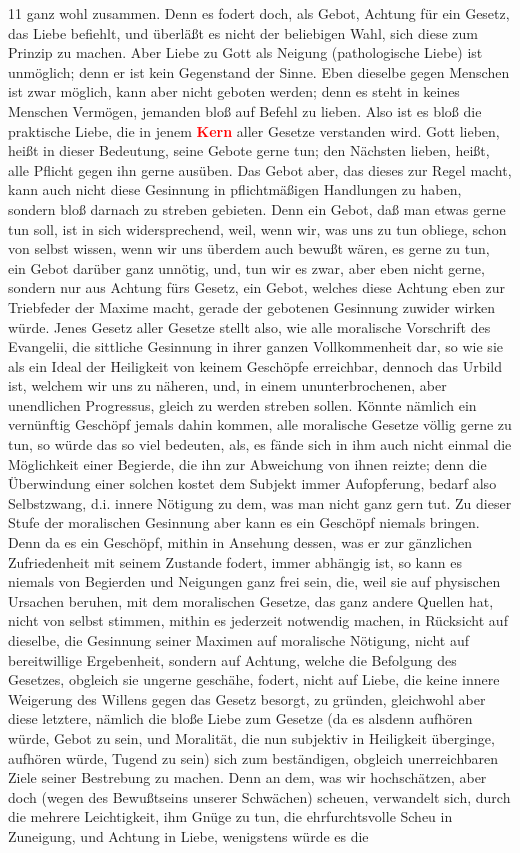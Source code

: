 \documentclass[a4paper,12pt,twoside]{book}
\newcommand{\match}[1]{\textcolor{red}{\textbf{#1}}}
\begin{document}
	
	11
	ganz wohl zusammen. Denn es fodert doch, als Gebot, Achtung für ein Gesetz, das Liebe befiehlt, und überläßt es nicht der beliebigen Wahl, sich diese zum Prinzip zu machen. Aber Liebe zu Gott als Neigung (pathologische Liebe) ist unmöglich; denn er ist kein Gegenstand der Sinne. Eben dieselbe gegen Menschen ist zwar möglich, kann aber nicht geboten werden; denn es steht in keines Menschen Vermögen, jemanden bloß auf Befehl zu lieben. Also ist es bloß die praktische Liebe, die in jenem \match{Kern} aller Gesetze verstanden wird. Gott lieben, heißt in dieser Bedeutung, seine Gebote gerne tun; den Nächsten lieben, heißt, alle Pflicht gegen ihn gerne ausüben. Das Gebot aber, das dieses zur Regel macht, kann auch nicht diese Gesinnung in pflichtmäßigen Handlungen zu haben, sondern bloß darnach zu streben gebieten. Denn ein Gebot, daß man etwas gerne tun soll, ist in sich widersprechend, weil, wenn wir, was uns zu tun obliege, schon von selbst wissen, wenn wir uns überdem auch bewußt wären, es gerne zu tun, ein Gebot darüber ganz unnötig, und, tun wir es zwar, aber eben nicht gerne, sondern nur aus Achtung fürs Gesetz, ein Gebot, welches diese Achtung eben zur Triebfeder der Maxime macht, gerade der gebotenen Gesinnung zuwider wirken würde. Jenes Gesetz aller Gesetze stellt also, wie alle moralische Vorschrift des Evangelii, die sittliche  Gesinnung in ihrer ganzen Vollkommenheit dar, so wie sie als ein Ideal der Heiligkeit von keinem Geschöpfe erreichbar, dennoch das Urbild ist, welchem wir uns zu näheren, und, in einem ununterbrochenen, aber unendlichen Progressus, gleich zu werden streben sollen. Könnte nämlich ein vernünftig Geschöpf jemals dahin kommen, alle moralische Gesetze völlig gerne zu tun, so würde das so viel bedeuten, als, es fände sich in ihm auch nicht einmal die Möglichkeit einer Begierde, die ihn zur Abweichung von ihnen reizte; denn die Überwindung einer solchen kostet dem Subjekt immer Aufopferung, bedarf also Selbstzwang, d.i. innere Nötigung zu dem, was man nicht ganz gern tut. Zu dieser Stufe der moralischen Gesinnung aber kann es ein Geschöpf niemals bringen. Denn da es ein Geschöpf, mithin in Ansehung dessen, was er zur gänzlichen Zufriedenheit mit seinem Zustande fodert, immer abhängig ist, so kann es niemals von Begierden und Neigungen ganz frei sein, die, weil sie auf physischen Ursachen beruhen, mit dem moralischen Gesetze, das ganz andere Quellen hat, nicht von selbst stimmen, mithin es jederzeit notwendig machen, in Rücksicht auf dieselbe, die Gesinnung seiner Maximen auf moralische Nötigung, nicht auf bereitwillige Ergebenheit, sondern auf Achtung, welche die Befolgung des Gesetzes, obgleich sie ungerne geschähe, fodert, nicht auf Liebe, die keine innere Weigerung des Willens gegen das Gesetz besorgt, zu gründen, gleichwohl aber diese letztere, nämlich die bloße Liebe zum Gesetze (da es alsdenn aufhören würde, Gebot zu sein, und Moralität, die nun subjektiv in Heiligkeit überginge, aufhören würde, Tugend zu sein) sich zum beständigen, obgleich unerreichbaren Ziele seiner Bestrebung zu machen. Denn an dem, was wir hochschätzen, aber doch (wegen des Bewußtseins unserer Schwächen) scheuen, verwandelt sich, durch die mehrere Leichtigkeit, ihm Gnüge zu tun, die ehrfurchtsvolle Scheu in Zuneigung, und Achtung in Liebe, wenigstens würde es die 
\end{document}
